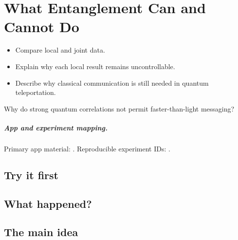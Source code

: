 \chapter[Limits of Entanglement]{What Entanglement Can and Cannot Do}
\label{chap:what-entanglement-can-and-cannot-do}

\begin{learningobjectives}
\begin{itemize}
  \item Compare local and joint data.
  \item Explain why each local result remains uncontrollable.
  \item Describe why classical communication is still needed in quantum teleportation.
\end{itemize}
\end{learningobjectives}

\begin{openingquestion}
Why do strong quantum correlations not permit faster-than-light messaging?
\end{openingquestion}

\paragraph{App and experiment mapping.}
Primary app material: . Reproducible experiment IDs:
.

\section{Try it first}
\begin{tryit}
\end{tryit}

\section{What happened?}

\section{The main idea}
\begin{coreidea}
\end{coreidea}

